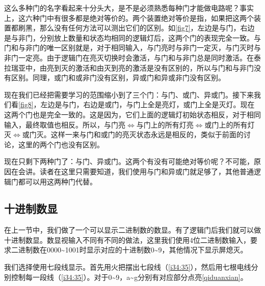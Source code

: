 这么多种门的名字看起来十分头大，是不是必须熟悉每种门才能做电路呢？事实上，这六种门中有很多都是绝对等价的。两个装置绝对等价是指，如果把这两个装置都刷黑，那么没有任何方法可以测出它们的区别。如\autoref{fig7}，左边是与门，右边是与非门，分别放上数量和状态均相同的逻辑灯后，这两个门的表现完全一致。与门和与非门的唯一区别就是，对于相同输入，与门亮时与非门一定灭，与门灭时与非门一定亮。由于逻辑门在亮灭切换时会激活，与门和与非门总是同时激活。在泰拉瑞亚中，由亮到灭的激活和由灭到亮的激活是没有区别的，所以与门和与非门没有区别。同理，或门和或非门没有区别，异或门和异或非门没有区别。

现在我们已经把需要学习的范围缩小到了三个门：与门、或门、异或门。接下来我们看\autoref{fig8}，左边是与门，右边是或门，与门上全是亮灯，或门上全是灭灯。现在这两个门也是完全一致的。这是因为，它们上面的逻辑灯初始状态相反，对于相同输入，最终取值也相反。所以，与门亮$\Longleftrightarrow$与门上的所有灯亮$\Longleftrightarrow$或门上的所有灯灭$\Longleftrightarrow$或门灭。这样一来与门和或门的亮灭状态永远是相反的，类似于前面的讨论，这里的两个门也没有区别。

现在只剩下两种门了：与门、异或门。这两个有没有可能绝对等价呢？不可能，原因在会讲。读者在这里只需要知道，我们使用与门和异或门就足够了，其他普通逻辑门都可以用这两种门代替。

\subsection{十进制数显}\label{sec2:2}

在上一节中，我们做了一个可以显示二进制数的数显。有了逻辑门后我们就可以做十进制数显。数显视输入不同有不同的做法，这里我们使用4位二进制数输入，要求二进制数在0000\~{}1001时显示对应的十进制数0\~{}9，其他情况下显示屏熄灭。

我们选择使用七段线显示。首先用火把摆出七段线（\autoref{i34:35}），然后用七根电线分别控制每一段线（\autoref{i34:35}）。对于0\~{}9，a\~{}g分别有对应部分点亮\autoref{qiduanxian}。

